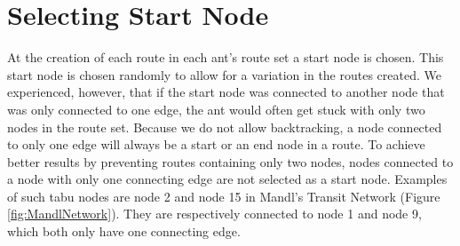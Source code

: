 \section{Selecting Start Node}

At the creation of each route in each ant's route set a start node is chosen. This start node is chosen randomly to allow for a variation in the routes created. We experienced, however, that if the start node was connected to another node that was only connected to one edge, the ant would often get stuck with only two nodes in the route set. Because we do not allow backtracking, a node connected to only one edge will always be a start or an end node in a route. To achieve better results by preventing routes containing only two nodes, nodes connected to a node with only one connecting edge are not selected as a start node. Examples of such tabu nodes are node 2 and node 15 in Mandl's Transit Network (Figure \vref{fig:MandlNetwork}). They are respectively connected to node 1 and node 9, which both only have one connecting edge. 